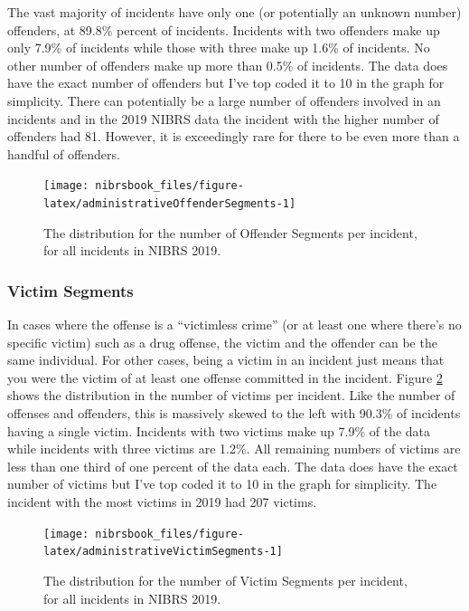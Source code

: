 \documentclass[
  12pt,
  openany]{book}
\begin{document}
The vast majority of incidents have only one (or potentially an unknown number) offenders, at 89.8\% percent of incidents. Incidents with two offenders make up only 7.9\% of incidents while those with three make up 1.6\% of incidents. No other number of offenders make up more than 0.5\% of incidents. The data does have the exact number of offenders but I've top coded it to 10 in the graph for simplicity. There can potentially be a large number of offenders involved in an incidents and in the 2019 NIBRS data the incident with the higher number of offenders had 81. However, it is exceedingly rare for there to be even more than a handful of offenders.

\begin{figure}

{\centering \texttt{[image: nibrsbook\_files/figure-latex/administrativeOffenderSegments-1]} 

}

\caption{The distribution for the number of Offender Segments per incident, for all incidents in NIBRS 2019.}\label{fig:administrativeOffenderSegments}
\end{figure}

\hypertarget{victim-segments}{%
\subsubsection{Victim Segments}\label{victim-segments}}

In cases where the offense is a ``victimless crime'' (or at least one where there's no specific victim) such as a drug offense, the victim and the offender can be the same individual. For other cases, being a victim in an incident just means that you were the victim of at least one offense committed in the incident. Figure \ref{fig:administrativeVictimSegments} shows the distribution in the number of victims per incident. Like the number of offenses and offenders, this is massively skewed to the left with 90.3\% of incidents having a single victim. Incidents with two victims make up 7.9\% of the data while incidents with three victims are 1.2\%. All remaining numbers of victims are less than one third of one percent of the data each. The data does have the exact number of victims but I've top coded it to 10 in the graph for simplicity. The incident with the most victims in 2019 had 207 victims.

\begin{figure}

{\centering \texttt{[image: nibrsbook\_files/figure-latex/administrativeVictimSegments-1]} 

}

\caption{The distribution for the number of Victim Segments per incident, for all incidents in NIBRS 2019.}\label{fig:administrativeVictimSegments}
\end{figure}
\end{document}
